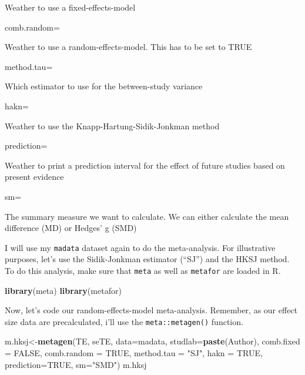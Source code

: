\documentclass[]{book}
\newenvironment{Shaded}{\begin{snugshade}}{\end{snugshade}}
\newcommand{\DataTypeTok}[1]{\textcolor[rgb]{0.13,0.29,0.53}{#1}}
\newcommand{\KeywordTok}[1]{\textcolor[rgb]{0.13,0.29,0.53}{\textbf{#1}}}
\newcommand{\NormalTok}[1]{#1}
\newcommand{\OtherTok}[1]{\textcolor[rgb]{0.56,0.35,0.01}{#1}}
\newcommand{\StringTok}[1]{\textcolor[rgb]{0.31,0.60,0.02}{#1}}
\begin{document}
Weather to use a fixed-effects-model

comb.random=

Weather to use a random-effects-model. This has to be set to TRUE

method.tau=

Which estimator to use for the between-study variance

hakn=

Weather to use the Knapp-Hartung-Sidik-Jonkman method

prediction=

Weather to print a prediction interval for the effect of future studies based on present evidence

sm=

The summary measure we want to calculate. We can either calculate the mean difference (MD) or Hedges' g (SMD)

I will use my \texttt{madata} dataset again to do the meta-analysis. For illustrative purposes, let's use the Sidik-Jonkman estimator (``SJ'') and the HKSJ method. To do this analysis, make sure that \texttt{meta} as well as \texttt{metafor} are loaded in R.

\begin{Shaded}
\begin{Highlighting}[]
\KeywordTok{library}\NormalTok{(meta)}
\KeywordTok{library}\NormalTok{(metafor)}
\end{Highlighting}
\end{Shaded}

Now, let's code our random-effects-model meta-analysis. Remember, as our effect size data are precalculated, i'll use the \texttt{meta::metagen()} function.

\begin{Shaded}
\begin{Highlighting}[]
\NormalTok{m.hksj<-}\KeywordTok{metagen}\NormalTok{(TE,}
\NormalTok{        seTE,}
        \DataTypeTok{data=}\NormalTok{madata,}
        \DataTypeTok{studlab=}\KeywordTok{paste}\NormalTok{(Author),}
        \DataTypeTok{comb.fixed =} \OtherTok{FALSE}\NormalTok{,}
        \DataTypeTok{comb.random =} \OtherTok{TRUE}\NormalTok{,}
        \DataTypeTok{method.tau =} \StringTok{"SJ"}\NormalTok{,}
        \DataTypeTok{hakn =} \OtherTok{TRUE}\NormalTok{,}
        \DataTypeTok{prediction=}\OtherTok{TRUE}\NormalTok{,}
        \DataTypeTok{sm=}\StringTok{"SMD"}\NormalTok{)}
\NormalTok{m.hksj}
\end{Highlighting}
\end{Shaded}
\end{document}

